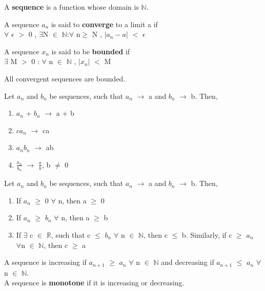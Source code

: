 \documentclass{report}
\begin{document}
\begin{definition}
A \textbf{sequence} is a function whose domain is $\mathbb{N}$.
\end{definition}

\begin{definition}
A sequence $a_n $ is said to \textbf{converge} to a limit a if \\
$\forall$ $\epsilon$ $>$ 0 , $\exists$N $\in$ $\mathbb{N}$:$\forall$ n$\geq$ N , $\lvert a_n - a \rvert$ $<$ $\epsilon$
\end{definition}

\begin{definition}
A sequence $x_n$ is said to be \textbf{bounded} if \\
 $\exists$ M $>$ 0 : $\forall$ n $\in$ $\mathbb{N}$ , $\lvert x_n \rvert$ $<$ M
\end{definition}

\begin{theorem}
All convergent sequences are bounded.
\end{theorem}

\begin{theorem}
Let $a_n$ and $b_n$ be sequences, such that $a_n$ $\rightarrow$ a and $b_n$ $\rightarrow$ b. Then,
\begin{enumerate}
\item $a_n$ + $b_n$ $\rightarrow$ a + b
\item $ca_n$ $\rightarrow$ ca
\item $a_n b_n$ $\rightarrow$ ab
\item $\frac{a_n}{b_n}$ $\rightarrow$ $\frac{a}{b}$, b $\neq$ 0
\end{enumerate}
\end{theorem}

\begin{theorem}
Let $a_n$ and $b_n$ be sequences, such that $a_n$ $\rightarrow$ a and $b_n$ $\rightarrow$ b. Then,
\begin{enumerate}
\item If $a_n$ $\geq$ 0 $\forall$ n, then a $\geq$ 0
\item If $a_n$ $\geq$ $b_n$ $\forall$ n, then a $\geq$ b
\item If $\exists$ c $\in$ $\mathbb{R}$, such that c $\leq$ $b_n$ $\forall$ n $\in$ $\mathbb{N}$, then c $\leq$ b. Similarly, if c $\geq$ $a_n$ \\ $\forall$n $\in$ $\mathbb{N}$, then c $\geq$ a
\end{enumerate}
\end{theorem}
\begin{definition}
A sequence is increasing if $a_{n+1}$ $\geq$ $a_n$ $\forall$ n $\in$ $\mathbb{N}$ and decreasing if  $a_{n+1}$ $\leq$ $a_n$ $\forall$ n $\in$ $\mathbb{N}$. \\
A sequence is \textbf{monotone} if it is increasing or decreasing.
\end{definition}
\end{document}
